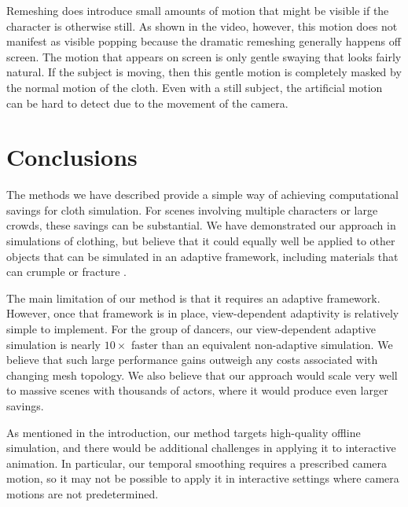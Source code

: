 \documentclass[10pt,journal,compsoc,twoside]{TexInputs/IEEEtran}
\begin{document}

Remeshing does introduce small amounts of motion that might be visible if
the character is otherwise still. As shown in the video, however, this motion
does not manifest as visible popping because the dramatic remeshing generally
happens off screen. The motion that appears on screen is only gentle swaying that
looks fairly natural. If the subject is moving, then this gentle motion is
completely masked by the normal motion of the cloth. Even with a still subject, the
artificial motion can  be hard to detect due to the movement of the camera.


\section{Conclusions}

The methods we have described provide a simple way of achieving computational
savings for cloth simulation. For scenes involving multiple characters or large
crowds, these savings can be substantial. We have demonstrated our approach in
simulations of clothing, but believe that it could equally well be applied to
other objects that can be simulated in an adaptive framework, including
materials that can crumple \cite{Narain:2013:FCA} or
fracture \cite{Pfaff:2014:ATC}.

The main limitation of our method is that it requires an adaptive framework.
However, once that framework is in place, view-dependent adaptivity is
relatively simple to implement. For the group of dancers, our view-dependent adaptive
simulation is nearly $10\times$ faster than an equivalent non-adaptive simulation. We
believe that such large performance gains outweigh any costs associated
with changing mesh topology. We also believe that our approach
would scale very well to massive scenes with thousands of actors, where it would
produce even larger savings.

As mentioned in the introduction, our method targets high-quality offline simulation,
and there would be additional challenges in applying it to interactive animation.
In particular, our temporal smoothing requires a prescribed camera motion, so it may not be possible to apply it in interactive settings 
where camera motions are not predetermined. 
\end{document}
